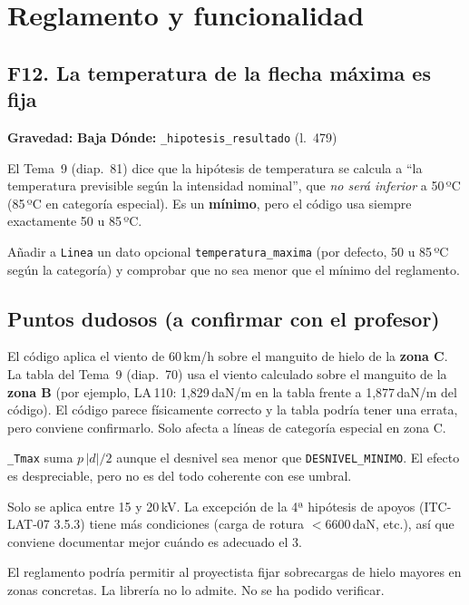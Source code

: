 \documentclass[11pt,a4paper]{article}
\newcommand{\baja}{\textcolor{baja}{\textbf{Baja}}}
\newcommand{\code}[1]{\texttt{#1}}
\newcommand{\fallo}[4]{%
  \subsection[#1. #2]{#1. #2}
  \noindent\textbf{Gravedad:} #3 \quad \textbf{Dónde:} #4\par\medskip}
\begin{document}
\section{Reglamento y funcionalidad}

\fallo{F12}{La temperatura de la flecha máxima es fija}{\baja}{\code{\_hipotesis\_resultado} (l.~479)}

El Tema~9 (diap.~81) dice que la hipótesis de temperatura se calcula a ``la temperatura previsible según la intensidad nominal'', que \emph{no será inferior} a 50\,ºC (85\,ºC en categoría especial). Es un \textbf{mínimo}, pero el código usa siempre exactamente 50 u 85\,ºC.

\begin{arreglo}
Añadir a \code{Linea} un dato opcional \code{temperatura\_maxima} (por defecto, 50 u 85\,ºC según la categoría) y comprobar que no sea menor que el mínimo del reglamento.
\end{arreglo}

\subsection{Puntos dudosos (a confirmar con el profesor)}
\label{sec:dudosos}

\begin{description}[leftmargin=1.5em, style=nextline]
  \item[D1. Sobrecarga de hielo + viento en zona C] El código aplica el viento de 60\,km/h sobre el manguito de hielo de la \textbf{zona C}. La tabla del Tema~9 (diap.~70) usa el viento calculado sobre el manguito de la \textbf{zona B} (por ejemplo, LA\,110: 1,829\,daN/m en la tabla frente a 1,877\,daN/m del código). El código parece físicamente correcto y la tabla podría tener una errata, pero conviene confirmarlo. Solo afecta a líneas de categoría especial en zona C.
  \item[D2. Desnivel por debajo de 1\,m] \code{\_Tmax} suma $p\,|d|/2$ aunque el desnivel sea menor que \code{DESNIVEL\_MINIMO}. El efecto es despreciable, pero no es del todo coherente con ese umbral.
  \item[D3. Coeficiente de seguridad 3 por defecto] Solo se aplica entre 15 y 20\,kV. La excepción de la 4ª hipótesis de apoyos (ITC-LAT-07 3.5.3) tiene más condiciones (carga de rotura $<6600$\,daN, etc.), así que conviene documentar mejor cuándo es adecuado el 3.
  \item[D4. Sobrecarga de hielo mayor] El reglamento podría permitir al proyectista fijar sobrecargas de hielo mayores en zonas concretas. La librería no lo admite. No se ha podido verificar.
\end{description}
\end{document}
